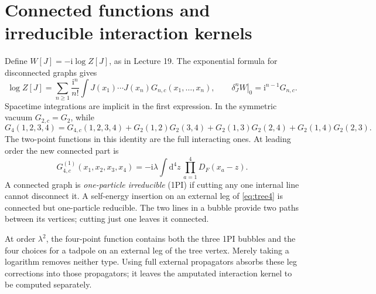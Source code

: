 \documentclass[11pt]{article}
\newcommand{\dd}{\mathrm d}
\newcommand{\ii}{\mathrm i}
\newcommand{\module}[1]{\clearpage\section{#1}}
\begin{document}
\module{Connected functions and irreducible interaction kernels}
Define \(W[J]=-\ii\log Z[J]\), as in Lecture 19. The exponential formula
for disconnected graphs gives
\begin{equation}
 \log Z[J]=\sum_{n\geq1}\frac{\ii^n}{n!}\int J(x_1)\cdots J(x_n)
 G_{n,c}(x_1,\ldots,x_n),\qquad
 \left.\delta_J^nW\right|_0=\ii^{n-1}G_{n,c}.     \label{eq:connected}
\end{equation}
Spacetime integrations are implicit in the first expression. In the
symmetric vacuum \(G_{2,c}=G_2\), while
\begin{equation}
 G_4(1,2,3,4)=G_{4,c}(1,2,3,4)
 +G_2(1,2)G_2(3,4)+G_2(1,3)G_2(2,4)+G_2(1,4)G_2(2,3).
 \label{eq:G4decompose}
\end{equation}
The two-point functions in this identity are the full interacting ones.
At leading order the new connected part is
\begin{equation}
 G_{4,c}^{(1)}(x_1,x_2,x_3,x_4)
 =-\ii\lambda\int\dd^4z\,\prod_{a=1}^4D_F(x_a-z).
 \label{eq:tree4}
\end{equation}
A connected graph is \emph{one-particle irreducible} (1PI) if cutting any
one internal line cannot disconnect it. A self-energy insertion on an
external leg of \eqref{eq:tree4} is connected but one-particle reducible.
The two lines in a bubble provide two paths between its vertices;
cutting just one leaves it connected.

\begin{center}
\end{center}
At order \(\lambda^2\), the four-point function contains both the three
1PI bubbles and the four choices for a tadpole on an external leg of
the tree vertex. Merely taking a logarithm removes neither type.
Using full external propagators absorbs these leg corrections into
those propagators; it leaves the amputated interaction kernel to be
computed separately.
\end{document}
